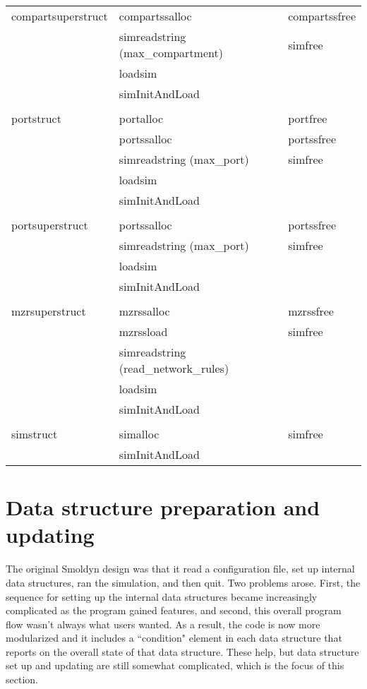 \documentclass {book}
\begin{document}
\begin{ttfamily}
\begin{longtable}[c]{lll}
compartsuperstruct&compartssalloc&compartssfree\\
&simreadstring (max\_compartment)&simfree\\
&loadsim\\
&simInitAndLoad\\
\\
portstruct&portalloc&portfree\\
&portssalloc&portssfree\\
&simreadstring (max\_port)&simfree\\
&loadsim\\
&simInitAndLoad\\
\\
portsuperstruct&portssalloc&portssfree\\
&simreadstring (max\_port)&simfree\\
&loadsim\\
&simInitAndLoad\\
\\
mzrsuperstruct&mzrssalloc&mzrssfree\\
&mzrssload&simfree\\
&simreadstring (read\_network\_rules)\\
&loadsim\\
&simInitAndLoad\\
\\
simstruct&simalloc&simfree\\
&simInitAndLoad\\
\end{longtable}
\end{ttfamily}

\section{Data structure preparation and updating}

The original Smoldyn design was that it read a configuration file, set up internal data structures, ran the simulation, and then quit. Two problems arose. First, the sequence for setting up the internal data structures became increasingly complicated as the program gained features, and second, this overall program flow wasn't always what users wanted. As a result, the code is now more modularized and it includes a ``condition" element in each data structure that reports on the overall state of that data structure. These help, but data structure set up and updating are still somewhat complicated, which is the focus of this section.
\end{document}
